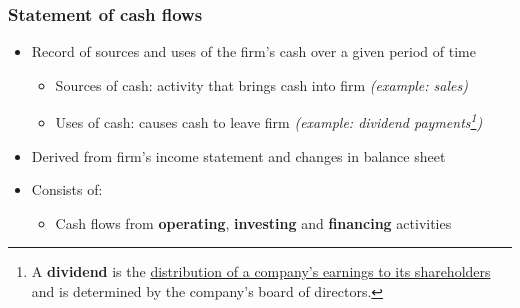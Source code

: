 \documentclass[ieeetran]{article}
\begin{document}
\subsubsection{Statement of cash flows} %
\label{ssub:statement_of_cash_flows}
\begin{itemize}
  \item Record of sources and uses of the firm's cash over a given period of time
	  \begin{itemize}
	    \item Sources of cash: activity that brings cash into firm \textit{(example: sales)}
	    \item Uses of cash: causes cash to leave firm \textit{(example: dividend payments\footnote{A \textbf{dividend} is the \underline{distribution of a company's earnings to its shareholders} and is determined by the company's board of directors.})}
	  \end{itemize}
	    \item Derived from firm's income statement and changes in balance sheet
	    \item Consists of:
		    \begin{itemize}
		      \item Cash flows from \textbf{operating}, \textbf{investing} and \textbf{financing} activities
		    \end{itemize}
\end{itemize}

\pagebreak
 
\end{document}
